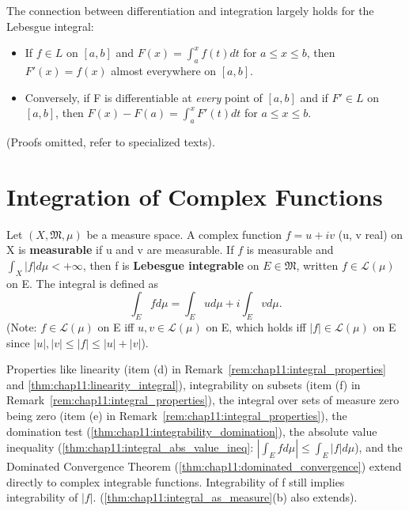 \begin{remark}
  \label{rem:chap11:ftc_lebesgue}
  The connection between differentiation and integration largely
  holds for the Lebesgue integral:
  \begin{itemize}
    \item If $f \in L$ on $[a, b]$ and $F(x) = \int_a^x f(t) dt$ for
      $a \le x \le b$, then $F'(x) = f(x)$ almost everywhere on $[a, b]$.
    \item Conversely, if F is differentiable at \textit{every} point
      of $[a, b]$ and if $F' \in L$ on $[a, b]$, then $F(x) - F(a) =
      \int_a^x F'(t) dt$ for $a \le x \le b$.
  \end{itemize}
  (Proofs omitted, refer to specialized texts).
\end{remark}

\section{Integration of Complex Functions}

\begin{definition}
  \label{def:chap11:complex_integration}
  Let $(X, \mathfrak{M}, \mu)$ be a measure space. A complex function
  $f = u + iv$ (u, v real) on X is \textbf{measurable} if u and v are
  measurable.
  If $f$ is measurable and $\int_X |f| d\mu < +\infty$, then f is
  \textbf{Lebesgue integrable} on $E \in \mathfrak{M}$, written $f
  \in \mathcal{L}(\mu)$ on E. The integral is defined as
  \[
    \int_E f d\mu = \int_E u d\mu + i \int_E v d\mu.
  \]
  (Note: $f \in \mathcal{L}(\mu)$ on E iff $u, v \in
    \mathcal{L}(\mu)$ on E, which holds iff $|f| \in \mathcal{L}(\mu)$
  on E since $|u|, |v| \le |f| \le |u| + |v|$).
\end{definition}


\begin{remark}
  \label{rem:chap11:complex_integral_properties}
  Properties like linearity (item (d) in
    Remark~\ref{rem:chap11:integral_properties} and
  \autoref{thm:chap11:linearity_integral}), integrability on subsets
  (item (f) in Remark~\ref{rem:chap11:integral_properties}), the
  integral over sets of measure zero being zero (item (e) in
  Remark~\ref{rem:chap11:integral_properties}), the domination test
  (\autoref{thm:chap11:integrability_domination}), the absolute value
  inequality (\autoref{thm:chap11:integral_abs_value_ineq}: $|\int_E
  f d\mu| \le \int_E |f| d\mu$), and the Dominated Convergence
  Theorem (\autoref{thm:chap11:dominated_convergence}) extend
  directly to complex integrable functions. Integrability of f still
  implies integrability of $|f|$.
  (\autoref{thm:chap11:integral_as_measure}(b) also extends).
\end{remark}

